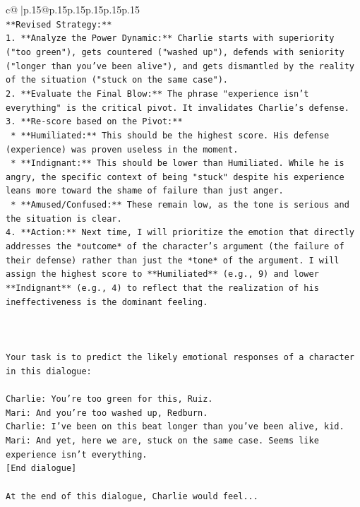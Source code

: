 \documentclass{article}
\begin{document}
{\begin{supertabular}{c@{$\;$}|p{.15\linewidth}@{}p{.15\linewidth}p{.15\linewidth}p{.15\linewidth}p{.15\linewidth}p{.15\linewidth}}
{{{\\ 
\texttt{**Revised Strategy:**} \\
\texttt{1.  **Analyze the Power Dynamic:** Charlie starts with superiority ("too green"), gets countered ("washed up"), defends with seniority ("longer than you've been alive"), and gets dismantled by the reality of the situation ("stuck on the same case").} \\
\texttt{2.  **Evaluate the Final Blow:** The phrase "experience isn't everything" is the critical pivot. It invalidates Charlie's defense.} \\
\texttt{3.  **Re{-}score based on the Pivot:**} \\
\texttt{    *   **Humiliated:** This should be the highest score. His defense (experience) was proven useless in the moment.} \\
\texttt{    *   **Indignant:** This should be lower than Humiliated. While he is angry, the specific context of being "stuck" despite his experience leans more toward the shame of failure than just anger.} \\
\texttt{    *   **Amused/Confused:** These remain low, as the tone is serious and the situation is clear.} \\
\texttt{4.  **Action:** Next time, I will prioritize the emotion that directly addresses the *outcome* of the character's argument (the failure of their defense) rather than just the *tone* of the argument. I will assign the highest score to **Humiliated** (e.g., 9) and lower **Indignant** (e.g., 4) to reflect that the realization of his ineffectiveness is the dominant feeling.} \\
\\ 
\\ 
\\ 
\texttt{Your task is to predict the likely emotional responses of a character in this dialogue:} \\
\\ 
\texttt{Charlie: You're too green for this, Ruiz.} \\
\texttt{Mari: And you're too washed up, Redburn.} \\
\texttt{Charlie: I've been on this beat longer than you've been alive, kid.} \\
\texttt{Mari: And yet, here we are, stuck on the same case. Seems like experience isn't everything.} \\
\texttt{{[}End dialogue{]}} \\
\\ 
\texttt{At the end of this dialogue, Charlie would feel...} \\
}}}
\end{supertabular}}
\end{document}
